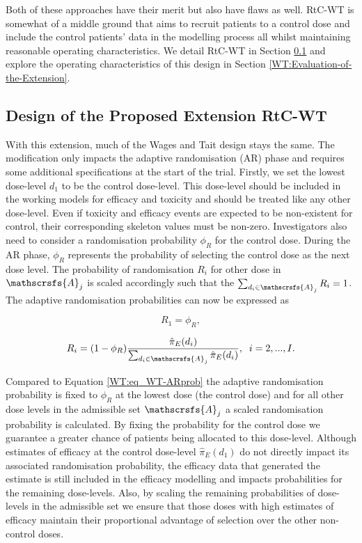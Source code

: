 Both of these approaches have their merit but also have flaws as well. RtC-WT is somewhat of a middle ground that aims to recruit patients to a control dose and include the control patients' data in the modelling process all whilst maintaining reasonable operating characteristics. We detail RtC-WT in Section \ref{WT:Design-RtC-WT} and explore the operating characteristics of this design in Section \ref{WT:Evaluation-of-the-Extension}.

\subsection{Design of the Proposed Extension RtC-WT}
\label{WT:Design-RtC-WT}

With this extension, much of the Wages and Tait design stays the same. The modification only impacts the adaptive randomisation (AR) phase and requires some additional specifications at the start of the trial. Firstly, we set the lowest dose-level $d_1$ to be the control dose-level. This dose-level should be included in the working models for efficacy and toxicity and should be treated like any other dose-level. Even if toxicity and efficacy events are expected to be non-existent for control, their corresponding skeleton values must be non-zero. Investigators also need to consider a randomisation probability $\phi_R$ for the control dose. During the AR phase, $\phi_R$ represents the probability of selecting the control dose as the next dose level. The probability of randomisation $R_i$ for other dose in $\mathscrsfs{A}_j$ is scaled accordingly such that the $\sum_{d_i \in \mathscrsfs{A}_j} R_i = 1$. The adaptive randomisation probabilities can now be expressed as 

\begin{equation}
	R_1 = \phi_R,
\end{equation}

\begin{equation}
	R_i = (1-\phi_R)\frac{\hat{\pi}_E(d_i)}{\sum_{d_i \in \mathscrsfs{A}_j}\hat{\pi}_E(d_i)}, \; \; i=2,...,I. 
\end{equation}

Compared to Equation \ref{WT:eq_WT-ARprob} the adaptive randomisation probability is fixed to $\phi_R$ at the lowest dose (the control dose) and for all other dose levels in the admissible set $\mathscrsfs{A}_j$ a scaled randomisation probability is calculated. By fixing the probability for the control dose we guarantee a greater chance of patients being allocated to this dose-level. Although estimates of efficacy at the control dose-level $\hat{\pi}_E(d_1)$ do not directly impact its associated randomisation probability, the efficacy data that generated the estimate is still included in the efficacy modelling and impacts probabilities for the remaining dose-levels. Also, by scaling the remaining probabilities of dose-levels in the admissible set we ensure that those doses with high estimates of efficacy maintain their proportional advantage of selection over the other non-control doses.

